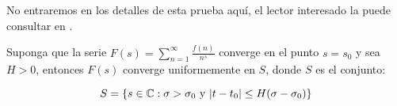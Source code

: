 No entraremos en los detalles de esta prueba aquí, el lector interesado la puede  consultar en \cite{stein2010complex}.
\begin{comment}
\begin{theorem}
Sea $\Omega\subseteq \C$ un abierto y sea $f:\Omega\to \C$ una función analítica, si $f(s_n)=0$ para infinitos puntos de $(s_n)$ y $(s_n)$ converge a $x\in \Omega$, entonces $f(s)=0$ para todo $s\in \Omega$
\end{theorem}
\end{comment}

\begin{theorem}
Suponga que la serie $F(s)=\displaystyle\sum_{n=1}^{\infty} \frac{f(n)}{n^s}$ converge en el punto $s=s_0$ y sea $H>0$, entonces $F(s)$ converge uniformemente en $S$, donde $S$ es el conjunto:

$$S=\{s\in \mathbb{C} : \sigma>\sigma_0 \text{ y } |t-t_0|\leq H(\sigma-\sigma_0)\}$$
\end{theorem}
\begin{center}

\end{center}

